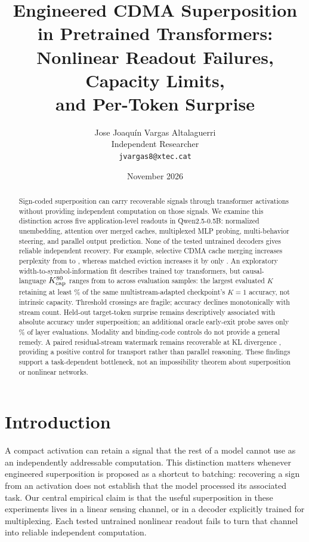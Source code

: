 \documentclass[11pt]{article}
\title{Engineered CDMA Superposition in Pretrained Transformers:\\Nonlinear Readout Failures, Capacity Limits,\\and Per-Token Surprise}
\author{Jose Joaqu\'in Vargas Altalaguerri\\Independent Researcher\\\texttt{jvargas8@xtec.cat}}
\date{November 2026}
\begin{document}
\maketitle
\begin{abstract}
Sign-coded superposition can carry recoverable signals through transformer activations without providing independent computation on those signals. We examine this distinction across five application-level readouts in Qwen2.5-0.5B: normalized unembedding, attention over merged caches, multiplexed MLP probing, multi-behavior steering, and parallel output prediction. None of the tested untrained decoders gives reliable independent recovery. For example, selective CDMA cache merging increases perplexity from \kvPplFull{} to \kvPplMerged{}, whereas matched eviction increases it by only \kvPplDelta{}. An exploratory width-to-symbol-information fit describes trained toy transformers, but causal-language $K_{\rm cap}^{80}$ ranges from \languageCapMin{} to \languageCapMax{} across evaluation samples: the largest evaluated $K$ retaining at least \languageThresholdPct\% of the same multistream-adapted checkpoint's $K=1$ accuracy, not intrinsic capacity. Threshold crossings are fragile; accuracy declines monotonically with stream count. Held-out target-token surprise remains descriptively associated with absolute accuracy under superposition; an additional oracle early-exit probe saves only \exitSaving\% of layer evaluations. Modality and binding-code controls do not provide a general remedy. A paired residual-stream watermark remains recoverable at KL divergence \wmKL{}, providing a positive control for transport rather than parallel reasoning. These findings support a task-dependent bottleneck, not an impossibility theorem about superposition or nonlinear networks.
\end{abstract}

\section{Introduction}
A compact activation can retain a signal that the rest of a model cannot use as an independently addressable computation. This distinction matters whenever engineered superposition is proposed as a shortcut to batching: recovering a sign from an activation does not establish that the model processed its associated task. Our central empirical claim is that the useful superposition in these experiments lives in a linear sensing channel, or in a decoder explicitly trained for multiplexing. Each tested untrained nonlinear readout fails to turn that channel into reliable independent computation.
\end{document}
